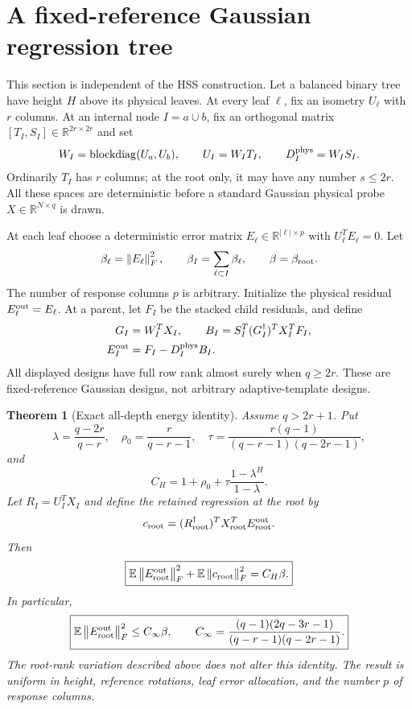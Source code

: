 \documentclass[11pt,oneside,openany,a4paper]{book}
\numberwithin{equation}{chapter}
\newtheorem{theorem}{Theorem}[chapter]
\theoremstyle{definition}
\theoremstyle{remark}
\newcommand{\R}{\mathbb R}\newcommand{\E}{\mathbb E}\newcommand{\Prb}{\mathbb P}\newcommand{\PP}{\mathbb P}
\newcommand{\F}[1]{\left\lVert#1\right\rVert_F}
\DeclareMathOperator{\diag}{blockdiag}\DeclareMathOperator{\range}{range}
\begin{document}
\section{A fixed-reference Gaussian regression tree}\label{tangent:sec:tree}
This section is independent of the HSS construction. Let a balanced binary tree have height $H$ above its physical leaves. At every leaf $\ell$, fix an isometry $U_\ell$ with $r$ columns. At an internal node $I=a\cup b$, fix an orthogonal matrix $[T_I,S_I]\in\R^{2r\times2r}$ and set
\[
 W_I=\diag(U_a,U_b),\qquad U_I=W_IT_I,\qquad D_I^{\rm phys}=W_IS_I.
\]
Ordinarily $T_I$ has $r$ columns; at the root only, it may have any number $s\le2r$. All these spaces are deterministic before a standard Gaussian physical probe $X\in\R^{N\times q}$ is drawn.

At each leaf choose a deterministic error matrix $E_\ell\in\R^{|\ell|\times p}$ with $U_\ell^TE_\ell=0$. Let
\[
 \beta_\ell=\F{E_\ell}^2,\qquad \beta_I=\sum_{\ell\subset I}\beta_\ell,
 \qquad\beta=\beta_{\rm root}.
\]
The number of response columns $p$ is arbitrary. Initialize the physical residual $E_\ell^{\rm out}=E_\ell$. At a parent, let $F_I$ be the stacked child residuals, and define
\begin{equation}\label{tangent:eq:regtree}
 \begin{split}
 G_I&=W_I^TX_I,\qquad
 B_I=S_I^T(G_I^\dagger)^TX_I^TF_I,\\
 E_I^{\rm out}&=F_I-D_I^{\rm phys}B_I.
 \end{split}
\end{equation}
All displayed designs have full row rank almost surely when $q\ge2r$. These are fixed-reference Gaussian designs, not arbitrary adaptive-template designs.

\begin{theorem}[Exact all-depth energy identity]\label{tangent:thm:energy}
Assume $q>2r+1$. Put
\begin{equation}\label{tangent:eq:consts}
 \lambda=\frac{q-2r}{q-r},\quad
 \rho_0=\frac r{q-r-1},\quad
 \tau=\frac{r(q-1)}{(q-r-1)(q-2r-1)},
\end{equation}
and
\[
 C_H=1+\rho_0+\tau\frac{1-\lambda^H}{1-\lambda}.
\]
Let $R_I=U_I^TX_I$ and define the retained regression at the root by
\[
 c_{\rm root}=(R_{\rm root}^\dagger)^TX_{\rm root}^TE_{\rm root}^{\rm out}.
\]
Then
\begin{equation}\label{tangent:eq:energyexact}
 \boxed{\E\F{E_{\rm root}^{\rm out}}^2+\E\F{c_{\rm root}}^2=C_H\beta.}
\end{equation}
In particular,
\begin{equation}\label{tangent:eq:cinf}
 \boxed{\E\F{E_{\rm root}^{\rm out}}^2
 \le C_\infty\beta,\qquad
 C_\infty=\frac{(q-1)(2q-3r-1)}{(q-r-1)(q-2r-1)}.}
\end{equation}
The root-rank variation described above does not alter this identity. The result is uniform in height, reference rotations, leaf error allocation, and the number $p$ of response columns.
\end{theorem}
\end{document}
